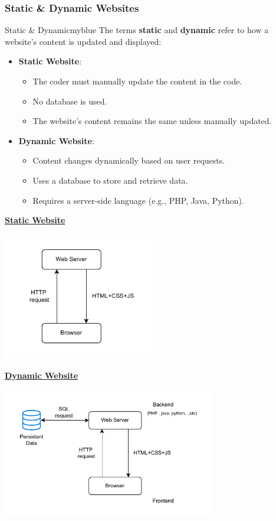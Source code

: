 \newpage

\subsubsection{Static \& Dynamic Websites}
\begin{prettyBox}{Static \& Dynamic}{myblue}
    The terms \textbf{static} and \textbf{dynamic} refer to how a website's content is updated and displayed:  
\begin{itemize}
    \item \textbf{Static Website}:
        \begin{itemize}
            \item The coder must manually update the content in the code.
            \item No database is used.
            \item The website's content remains the same unless manually updated.
        \end{itemize}
    \item \textbf{Dynamic Website}:
       \begin{itemize}
        \item Content changes dynamically based on user requests.
        \item Uses a database to store and retrieve data.
        \item Requires a server-side language (e.g., PHP, Java, Python).
       \end{itemize}
\end{itemize}
\end{prettyBox}


\vspace{1cm}

\textbf{\underline{Static Website}}
\begin{center}
\includegraphics[width=0.5\textwidth]{Chapters/Diagram/Intro/static.drawio.pdf}
\end{center}


\newpage
\textbf{\underline{Dynamic Website}}
\begin{center}
\includegraphics[width=0.7\textwidth]{Chapters/Diagram/Intro/dynamic.drawio.pdf}
\end{center}



